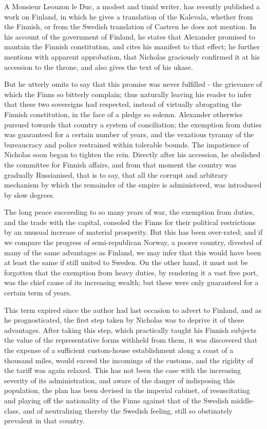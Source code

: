 \documentclass[10pt,a4paper]{article}
\begin{document}
A Monsieur Leouzon le Duc, a modest and timid writer, has recently published a work on Finland, in which he gives a translation of the Kalevala, whether from the Finnish, or from the Swedish translation of Castren he does not mention. In his account of the government of Finland, he states that Alexander promised to mantain the Finnish constitution, and cites his manifest to that effect; he further mentions with apparent approbation, that Nicholas graciously confirmed it at his accession to the throne, and also gives the text of his ukase.

But he utterly omits to say that this promise was never fulfilled - the grievance of which the Finns so bitterly complain; thus naturally leaving his reader to infer that these two sovereigns had respected, instead of virtually abrogating the Finnish constitution, in the face of a pledge so solemn. Alexander otherwise pursued towards that country a system of conciliation; the exemption from duties was guaranteed for a certain number of years, and the vexatious tyranny of the bureaucracy and police restrained within tolerable bounds. The impatience of Nicholas soon began to tighten the rein. Directly after his accession, he abolished the committee for Finnish affairs, and from that moment the country was gradually Russianised, that is to say, that all the corrupt and arbitrary mechanism by which the remainder of the empire is administered, was introduced by slow degrees.

The long peace succeeding to so many years of war, the exemption from duties, and the trade with the capital, consoled the Finns for their political restrictions by an unusual increase of material prosperity. But this has been over-rated; and if we compare the progress of semi-republican Norway, a poorer country, divested of many of the same advantages as Finland, we may infer that this would have been at least the same if still united to Sweden. On the other hand, it must not be forgotten that the exemption from heavy duties, by rendering it a vast free port, was the chief cause of its increasing wealth; but these were only guaranteed for a certain term of years.

This term expired since the author had last occasion to advert to Finland, and as he prognosticated, the first step taken by Nicholas was to deprive it of these advantages. After taking this step, which practically taught his Finnish subjects the value of the representative forms withheld from them, it was discovered that the expense of a sufficient custom-house establishment along a coast of a thousand miles, would exceed the incomings of the customs, and the rigidity of the tariff was again relaxed. This has not been the case with the increasing severity of its administration, and aware of the danger of indisposing this population, the plan has been devised in the imperial cabinet, of resuscitating and playing off the nationality of the Finns against that of the Swedish middle-class, and of neutralizing thereby the Swedish feeling, still so obstinately prevalent in that country.
\end{document}
